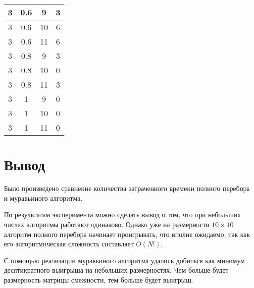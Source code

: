 \begin{table}[h!]
\begin{center}
\begin{tabular}{|c|c|c|c|}
3 &   0.6 &     9 &     3 \\ \hline 
3 &   0.6 &    10 &     6 \\ \hline 
3 &   0.6 &    11 &     6 \\ \hline 
3 &   0.8 &     9 &     3 \\ \hline 
3 &   0.8 &    10 &     0 \\ \hline 
3 &   0.8 &    11 &     3 \\ \hline 
3 &     1 &     9 &     0 \\ \hline 
3 &     1 &    10 &     0 \\ \hline 
3 &     1 &    11 &     0 \\ \hline 
		\end{tabular}
	\end{center}
\end{table}

\captionsetup{singlelinecheck = false, justification=centering}

\clearpage

\section{Вывод}

Было произведено сравнение количества затраченного времени полного перебора и муравьиного алгоритма.

По результатам эксперимента можно сделать вывод о том, что при небольших числах алгоритмы рабо­тают одинаково. Однако уже на размерности $10\times10$ алгоритм полного перебора начинает проигрывать, что вполне ожидаемо, так как его алгоритмическая сложность составляет $O(N!)$.

С помощью реализации муравьиного алгоритма удалось добиться как минимум десятикратного выигрыша на небольших размерностях. Чем больше будет размерность матрицы смежности, тем больше будет выиг­рыш.



